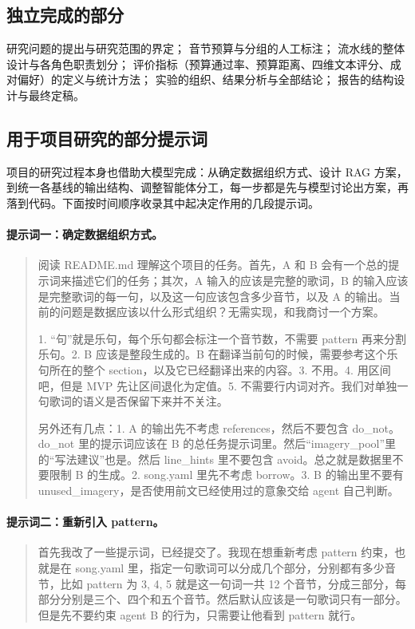 \documentclass[12pt, a4paper]{ctexart}
\numberwithin{table}{section}
\numberwithin{figure}{section}
\begin{document}
\subsection{独立完成的部分}
研究问题的提出与研究范围的界定；
音节预算与分组的人工标注；
流水线的整体设计与各角色职责划分；
评价指标（预算通过率、预算距离、四维文本评分、成对偏好）的定义与统计方法；
实验的组织、结果分析与全部结论；
报告的结构设计与最终定稿。

\subsection{用于项目研究的部分提示词}

项目的研究过程本身也借助大模型完成：从确定数据组织方式、设计 RAG 方案，到统一各基线的输出结构、调整智能体分工，每一步都是先与模型讨论出方案，再落到代码。下面按时间顺序收录其中起决定作用的几段提示词。

\paragraph{提示词一：确定数据组织方式。}
\begin{quote}\small
阅读 README.md 理解这个项目的任务。首先，A 和 B 会有一个总的提示词来描述它们的任务；其次，A 输入的应该是完整的歌词，B 的输入应该是完整歌词的每一句，以及这一句应该包含多少音节，以及 A 的输出。当前的问题是数据应该以什么形式组织？无需实现，和我商讨一个方案。

1. “句”就是乐句，每个乐句都会标注一个音节数，不需要 pattern 再来分割乐句。2. B 应该是整段生成的。B 在翻译当前句的时候，需要参考这个乐句所在的整个 section，以及它已经翻译出来的内容。3. 不用。4. 用区间吧，但是 MVP 先让区间退化为定值。5. 不需要行内词对齐。我们对单独一句歌词的语义是否保留下来并不关注。

另外还有几点：1. A 的输出先不考虑 references，然后不要包含 do\_not。do\_not 里的提示词应该在 B 的总任务提示词里。然后“imagery\_pool”里的“写法建议”也是。然后 line\_hints 里不要包含 avoid。总之就是数据里不要限制 B 的生成。2. song.yaml 里先不考虑 borrow。3. B 的输出里不要有 unused\_imagery，是否使用前文已经使用过的意象交给 agent 自己判断。
\end{quote}

\paragraph{提示词二：重新引入 pattern。}
\begin{quote}\small
首先我改了一些提示词，已经提交了。我现在想重新考虑 pattern 约束，也就是在 song.yaml 里，指定一句歌词可以分成几个部分，分别都有多少音节，比如 pattern 为 3, 4, 5 就是这一句词一共 12 个音节，分成三部分，每部分分别是三个、四个和五个音节。然后默认应该是一句歌词只有一部分。但是先不要约束 agent B 的行为，只需要让他看到 pattern 就行。
\end{quote}
\end{document}
